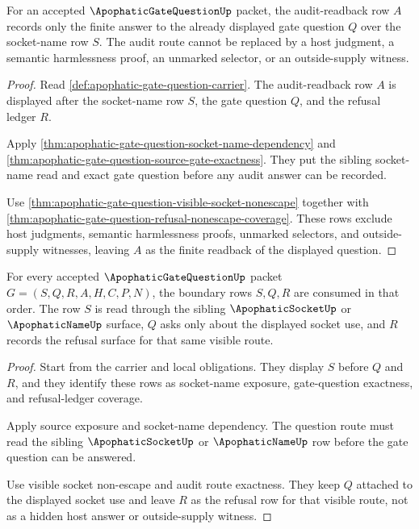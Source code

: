 \begin{theorem}
\label{thm:apophatic-gate-question-audit-route-exactness}
For an accepted $\ApophaticGateQuestionUp$ packet, the audit-readback row $A$ records only the finite answer to the already displayed gate question $Q$ over the socket-name row $S$. The audit route cannot be replaced by a host judgment, a semantic harmlessness proof, an unmarked selector, or an outside-supply witness.
\end{theorem}
\begin{proof}
Read \autoref{def:apophatic-gate-question-carrier}. The audit-readback row $A$ is displayed after the socket-name row $S$, the gate question $Q$, and the refusal ledger $R$.

Apply \autoref{thm:apophatic-gate-question-socket-name-dependency} and \autoref{thm:apophatic-gate-question-source-gate-exactness}. They put the sibling socket-name read and exact gate question before any audit answer can be recorded.

Use \autoref{thm:apophatic-gate-question-visible-socket-nonescape} together with \autoref{thm:apophatic-gate-question-refusal-nonescape-coverage}. These rows exclude host judgments, semantic harmlessness proofs, unmarked selectors, and outside-supply witnesses, leaving $A$ as the finite readback of the displayed question.
\end{proof}

\begin{theorem}
\label{thm:apophatic-gate-question-boundary-row-triad}
For every accepted $\ApophaticGateQuestionUp$ packet $G=(S,Q,R,A,H,C,P,N)$, the boundary rows $S,Q,R$ are consumed in that order. The row $S$ is read through the sibling $\ApophaticSocketUp$ or $\ApophaticNameUp$ surface, $Q$ asks only about the displayed socket use, and $R$ records the refusal surface for that same visible route.
\end{theorem}
\begin{proof}
Start from the carrier and local \NameCert{} obligations. They display $S$ before $Q$ and $R$, and they identify these rows as socket-name exposure, gate-question exactness, and refusal-ledger coverage.

Apply source exposure and socket-name dependency. The question route must read the sibling $\ApophaticSocketUp$ or $\ApophaticNameUp$ row before the gate question can be answered.

Use visible socket non-escape and audit route exactness. They keep $Q$ attached to the displayed socket use and leave $R$ as the refusal row for that visible route, not as a hidden host answer or outside-supply witness.
\end{proof}

